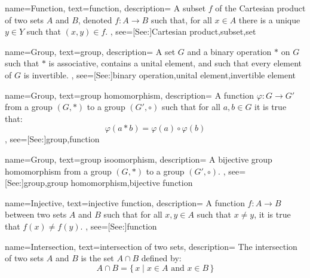 {
    name={Function},
    text={function},
    description={
        A subset $f$ of the Cartesian product of two sets $A$ and $B$,
        denoted $f:A\rightarrow{B}$ such that, for all $x\in{A}$ there is
        a unique $y\in{Y}$ such that $(x,y)\in{f}$.
    },
    see=[See:]{Cartesian product,subset,set}
}

{
    name={Group},
    text={group},
    description={
        A set $G$ and a binary operation $*$ on $G$ such that
        $*$ is associative, contains a unital element, and such that
        every element of $G$ is invertible.
    },
    see=[See:]{binary operation,unital element,invertible element}
}

{
    name={Group},
    text={group homomorphism},
    description={
        A function $\varphi:G\rightarrow{G}'$ from a group $(G,*)$ to a group
        $(G',\circ)$ such that for all $a,b\in{G}$ it is true that:
        \begin{equation*}
            \varphi(a*b)=\varphi(a)\circ\varphi(b)
        \end{equation*}
    },
    see=[See:]{group,function}
}

{
    name={Group},
    text={group isoomorphism},
    description={
        A bijective group homomorphism from a group $(G,*)$ to a group
        $(G',\circ)$.
    },
    see=[See:]{group,group homomorphism,bijective function}
}

{
    name={Injective},
    text={injective function},
    description={
        A function $f:A\rightarrow{B}$ between two sets $A$ and $B$ such
        that for all $x,y\in{A}$ such that $x\ne{y}$, it is true that
        $f(x)\ne{f}(y)$.
    },
    see=[See:]{function}
}

{
    name={Intersection},
    text={intersection of two sets},
    description={
        The intersection of two sets $A$ and $B$ is the set $A\cap{B}$
        defined by:
        \begin{equation*}
            A\cap{B}=\big\{\,x\;|\;x\in{A}\textrm{ and }x\in{B}\,\big\}
        \end{equation*}
    }
}

